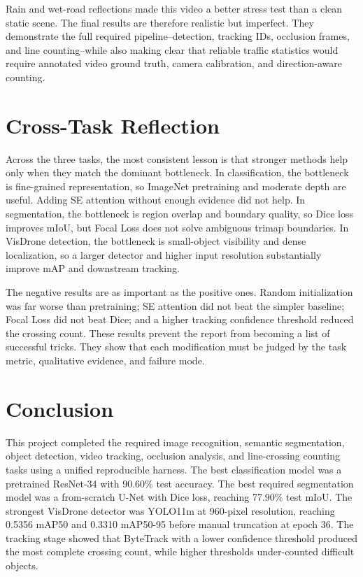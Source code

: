 \documentclass[10pt,twocolumn]{article}
\begin{document}
Rain and wet-road reflections made this video a better stress test than a clean static scene. The final results are therefore realistic but imperfect. They demonstrate the full required pipeline--detection, tracking IDs, occlusion frames, and line counting--while also making clear that reliable traffic statistics would require annotated video ground truth, camera calibration, and direction-aware counting.

\section{Cross-Task Reflection}

Across the three tasks, the most consistent lesson is that stronger methods help only when they match the dominant bottleneck. In classification, the bottleneck is fine-grained representation, so ImageNet pretraining and moderate depth are useful. Adding SE attention without enough evidence did not help. In segmentation, the bottleneck is region overlap and boundary quality, so Dice loss improves mIoU, but Focal Loss does not solve ambiguous trimap boundaries. In VisDrone detection, the bottleneck is small-object visibility and dense localization, so a larger detector and higher input resolution substantially improve mAP and downstream tracking.

The negative results are as important as the positive ones. Random initialization was far worse than pretraining; SE attention did not beat the simpler baseline; Focal Loss did not beat Dice; and a higher tracking confidence threshold reduced the crossing count. These results prevent the report from becoming a list of successful tricks. They show that each modification must be judged by the task metric, qualitative evidence, and failure mode.

\section{Conclusion}

This project completed the required image recognition, semantic segmentation, object detection, video tracking, occlusion analysis, and line-crossing counting tasks using a unified reproducible harness. The best classification model was a pretrained ResNet-34 with 90.60\% test accuracy. The best required segmentation model was a from-scratch U-Net with Dice loss, reaching 77.90\% test mIoU. The strongest VisDrone detector was YOLO11m at 960-pixel resolution, reaching 0.5356 mAP50 and 0.3310 mAP50-95 before manual truncation at epoch 36. The tracking stage showed that ByteTrack with a lower confidence threshold produced the most complete crossing count, while higher thresholds under-counted difficult objects.
\end{document}
